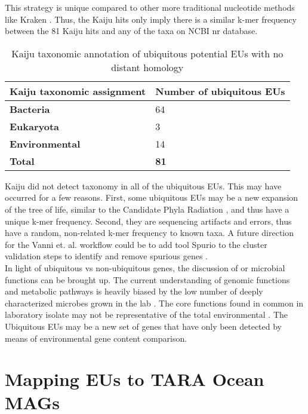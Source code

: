 This strategy is unique compared to other more traditional nucleotide methods like Kraken \citep{Wood_2014}. Thus, the Kaiju hits only imply there is a similar k-mer frequency between the 81 Kaiju hits and any of the taxa on NCBI nr database. \\

\begin{table}[H]
\centering
\caption{Kaiju taxonomic annotation of ubiquitous potential EUs with no distant homology}
\label{table:3.7}
\begin{tabular}{ll}
\toprule
\textbf{Kaiju taxonomic assignment} & \textbf{Number of ubiquitous EUs} \\
\midrule
\textbf{Bacteria} & 64 \\
\textbf{Eukaryota} & 3 \\
\textbf{Environmental} & 14 \\ \midrule
\textbf{Total} & \textbf{81} \\
\bottomrule
\end{tabular}
\end{table}

Kaiju did not detect taxonomy in all of the ubiquitous EUs. This may have occurred for a few reasons. First, some ubiquitous EUs may be a new expansion of the tree of life, similar to the Candidate Phyla Radiation \citep{Danczak_2017}, and thus have a unique k-mer frequency. Second, they are sequencing artifacts and errors, thus have a random, non-related k-mer frequency to known taxa. A future direction for the Vanni et. al. workflow could be to add tool Spurio to the cluster validation steps to identify and remove spurious genes \citep{H_ps_2018}. \\

In light of ubiquitous vs non-ubiquitous genes, the discussion of  or  microbial functions can be brought up. The current understanding of  genomic functions and metabolic pathways is heavily biased by the low number of deeply characterized microbes grown in the lab \citep{Prosser_2014}. The core functions found in common in laboratory isolate may not be representative of the total environmental . The Ubiquitous EUs may be a new  set of genes that have only been detected by means of environmental gene content comparison. \\

\section{Mapping EUs to TARA Ocean MAGs}

